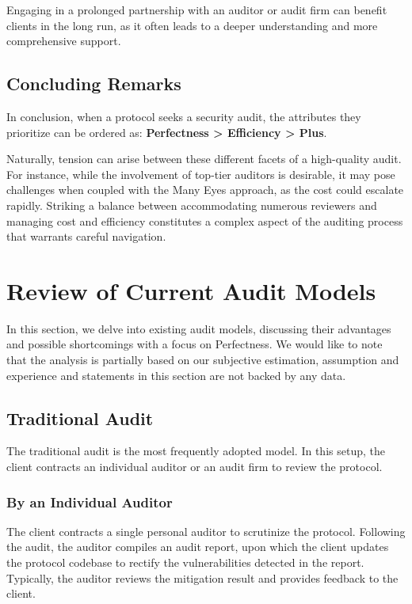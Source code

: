 \documentclass[10pt]{extarticle}
\begin{document}
Engaging in a prolonged partnership with an auditor or audit firm can
benefit clients in the long run, as it often leads to a deeper
understanding and more comprehensive support.

\subsection{ Concluding Remarks}\label{24-concluding-remarks}

In conclusion, when a protocol seeks a security audit, the attributes
they prioritize can be ordered as: \textbf{Perfectness \textgreater{}
Efficiency \textgreater{} Plus}.

Naturally, tension can arise between these different facets of a
high-quality audit. For instance, while the involvement of top-tier
auditors is desirable, it may pose challenges when coupled with the
\textquotesingle Many Eyes\textquotesingle{} approach, as the cost could
escalate rapidly. Striking a balance between accommodating numerous
reviewers and managing cost and efficiency constitutes a complex aspect
of the auditing process that warrants careful navigation.

\section{ Review of Current Audit
Models}\label{3-review-of-current-audit-models}

In this section, we delve into existing audit models, discussing their
advantages and possible shortcomings with a focus on Perfectness. We
would like to note that the analysis is partially based on our
subjective estimation, assumption and experience and statements in this
section are not backed by any data.

\subsection{ Traditional Audit}\label{31-traditional-audit}

The traditional audit is the most frequently adopted model. In this
setup, the client contracts an individual auditor or an audit firm to
review the protocol.

\subsubsection{ By an Individual
Auditor}\label{311-by-an-individual-auditor}

The client contracts a single personal auditor to scrutinize the
protocol. Following the audit, the auditor compiles an audit report,
upon which the client updates the protocol codebase to rectify the
vulnerabilities detected in the report. Typically, the auditor reviews
the mitigation result and provides feedback to the client.
\end{document}
